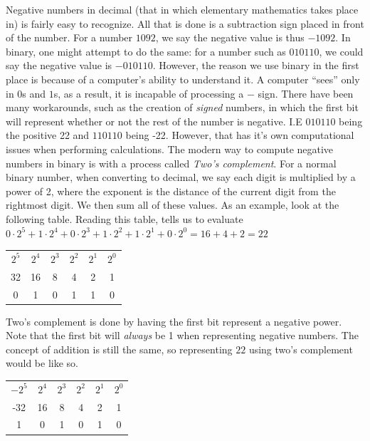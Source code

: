 \documentclass[oneside]{book}
\begin{document}
\tab
Negative numbers in decimal (that in which elementary mathematics takes place in) is fairly easy to recognize. All that is done is a subtraction sign placed in front of the number. For a number $1092$, we say the negative value is thus $-1092$. In binary, one might attempt to do the same: for a number such as $010110$, we could say the negative value is $-010110$. However, the reason we use binary in the first place is because of a computer's ability to understand it. A computer ``sees'' only in $0$s and $1$s, as a result, it is incapable of processing a $-$ sign. There have been many workarounds, such as the creation of \textit{signed} numbers, in which the first bit will represent whether or not the rest of the number is negative. I.E $010110$ being the positive 22 and $110110$ being -22. However, that has it's own computational issues when performing calculations. The modern way to compute negative numbers in binary is with a process called \textit{Two's complement}. For a normal binary number, when converting to decimal, we say each digit is multiplied by a power of 2, where the exponent is the distance of the current digit from the rightmost digit. We then sum all of these values. As an example, look at the following table. Reading this table, tells us to evaluate $0\cdot2^5 + 1\cdot 2^4 + 0\cdot2^3 + 1\cdot 2^2 + 1\cdot 2^1 + 0\cdot2^0 = 16+4+2=22$
\begin{center}
\begin{tabular}{|c|c|c|c|c|c|}
\hline
$2^5$ & $2^4$ & $2^3$ & $2^2$ & $2^1$ & $2^0$ \\
32 & 16 & 8 & 4 & 2 & 1\\
\hline
0 & 1 & 0 & 1 & 1 & 0 \\
\hline
\end{tabular}
\end{center}
\tab
Two's complement is done by having the first bit represent a negative power. Note that the first bit will \textit{always} be 1 when representing negative numbers. The concept of addition is still the same, so representing $22$ using two's complement would be like so.
\begin{center}
\begin{tabular}{|c|c|c|c|c|c|}
\hline
$-2^5$ & $2^4$ & $2^3$ & $2^2$ & $2^1$ & $2^0$ \\
-32 & 16 & 8 & 4 & 2 & 1\\
\hline
1 & 0 & 1 & 0 & 1 & 0 \\
\hline
\end{tabular}
\end{center}
\end{document}
